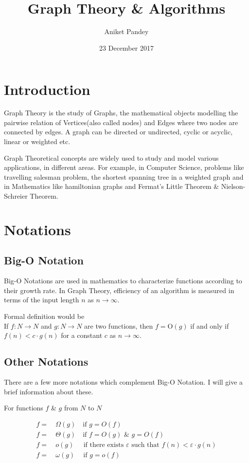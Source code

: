 \documentclass[11pt,a4paper]{extarticle}
\title{\textbf{Graph Theory \& Algorithms}}
\date{23 December 2017}
\author{Aniket Pandey}
\begin{document}
\maketitle

\section{Introduction}
Graph Theory is the study of Graphs, the mathematical objects modelling the pairwise relation of Vertices(also called nodes) and Edges where two nodes are connected by edges. A graph can be directed or undirected, cyclic or acyclic, linear or weighted etc. 

Graph Theoretical concepts are widely used to study and model various applications, in different areas. For example, in Computer Science, problems like travelling salesman problem, the shortest spanning tree in a weighted graph and in Mathematics like hamiltonian graphs and Fermat's Little Theorem \& Nielson-Schreier Theorem. 

\section{Notations}
\subsection{Big-O Notation}
Big-O Notations are used in mathematics to characterize functions according to their growth rate. In Graph Theory, efficiency of an algorithm is measured in terms of the input length $n$ as $n\rightarrow \infty $.\par Formal definition would be\\If $f:N\rightarrow N$ and $g:N\rightarrow N$ are two functions, then $f=$O$(g)$ if and only if $f(n)<c \cdot g(n)$ for a constant $c$ as $n\rightarrow\infty$.
\subsection{Other Notations}
There are a few more notations which complement Big-O Notation. I will give a brief information about these.\par
For functions $f$ \& $g$ from $N$ to $N$

\begin{align}
f =&\:\Omega(g)\quad  \textrm{if} \,\,  g=O(f)\\
f =&\:\Theta(g)\quad \textrm{if} \,\,  f=O(g) \,\, \& \,\, g=O(f)\\
f =&\:o(g)\:\,\quad \textrm{if there exists }\varepsilon \textrm{ such that} \,\, f(n)<\varepsilon\cdot g(n) \\
f =&\:\omega(g)\quad \:\textrm{if} \,\,  g=o(f)
\end{align}
\end{document}

